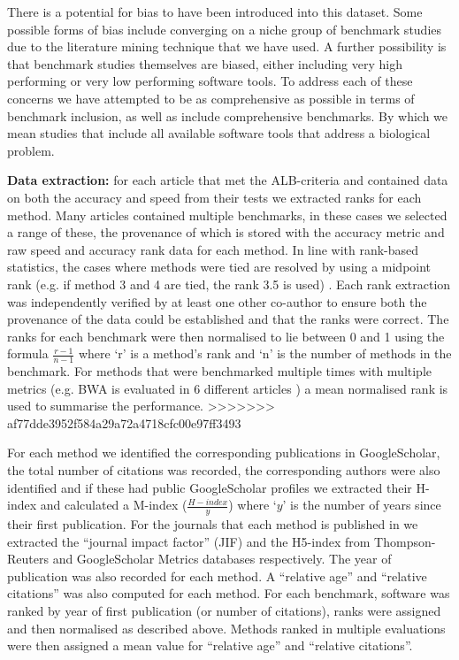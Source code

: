 \documentclass[fleqn,10pt]{SelfArx} %
\begin{document}
There is a potential for bias to have been introduced into this dataset. Some possible forms of bias include converging on a niche group of benchmark studies due to the literature mining technique that we have used. A further possibility is that benchmark studies themselves are biased, either including very high performing or very low performing software tools. To address each of these concerns we have attempted to be as comprehensive as possible in terms of benchmark inclusion, as well as include comprehensive benchmarks. By which we mean studies that include all available software tools that address a biological problem. 

\textbf{Data extraction:} for each article that met the ALB-criteria and contained data on both the accuracy and speed from their tests we extracted ranks for each method. Many articles contained multiple benchmarks, in these cases we selected a range of these, the provenance of which is stored with the accuracy metric and raw speed and accuracy rank data for each method. In line with rank-based statistics, the cases where methods were tied are resolved by using a midpoint rank (e.g. if method 3 and 4 are tied, the rank 3.5 is used) \cite{Mann1947-re}. Each rank extraction was independently verified by at least one other co-author to ensure both the provenance of the data could be established and that the ranks were correct. The ranks for each benchmark were then normalised to lie between 0 and 1 using the formula $\frac{r-1}{n-1}$ where ‘r’ is a method’s rank and ‘n’ is the number of methods in the benchmark. For methods that were benchmarked multiple times with multiple metrics (e.g. BWA is evaluated in 6 different articles \cite{Bao2011-lv,Caboche2014-lj,Hatem2013-cs,Schbath2012-ob,Ruffalo2011-rl,Holtgrewe2011-fd}) a mean normalised rank is used to summarise the performance.
>>>>>>> af77dde3952f584a29a72a4718cfc00e97ff3493
 
For each method we identified the corresponding publications in GoogleScholar, the total number of citations was recorded, the corresponding authors were also identified and if these had public GoogleScholar profiles we extracted their H-index and calculated a M-index ($\frac{H-index}{y}$) where ‘$y$’ is the number of years since their first publication. For the journals that each method is published in we extracted the “journal impact factor” (JIF) and the H5-index from Thompson-Reuters and GoogleScholar Metrics databases respectively. The year of publication was also recorded for each method. A “relative age” and “relative citations” was also computed for each method. For each benchmark, software was ranked by year of first publication (or number of citations), ranks were assigned and then normalised as described above. Methods ranked in multiple evaluations were then assigned a mean value for “relative age” and “relative citations”. 
\end{document}
